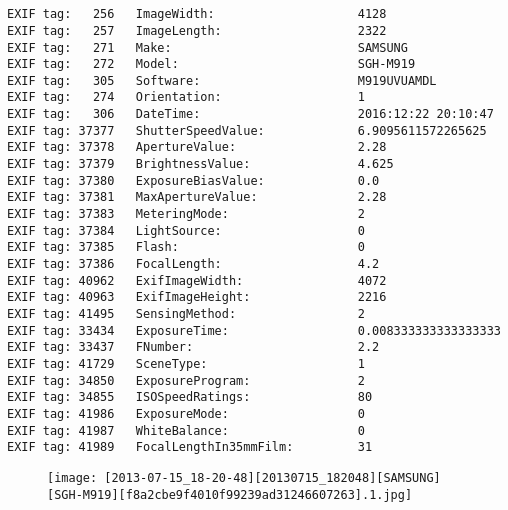 \section{\protect{}}
\noindent 
\noindent
\begin{lstlisting}
EXIF tag:   256   ImageWidth:                    4128
EXIF tag:   257   ImageLength:                   2322
EXIF tag:   271   Make:                          SAMSUNG
EXIF tag:   272   Model:                         SGH-M919
EXIF tag:   305   Software:                      M919UVUAMDL
EXIF tag:   274   Orientation:                   1
EXIF tag:   306   DateTime:                      2016:12:22 20:10:47
EXIF tag: 37377   ShutterSpeedValue:             6.9095611572265625
EXIF tag: 37378   ApertureValue:                 2.28
EXIF tag: 37379   BrightnessValue:               4.625
EXIF tag: 37380   ExposureBiasValue:             0.0
EXIF tag: 37381   MaxApertureValue:              2.28
EXIF tag: 37383   MeteringMode:                  2
EXIF tag: 37384   LightSource:                   0
EXIF tag: 37385   Flash:                         0
EXIF tag: 37386   FocalLength:                   4.2
EXIF tag: 40962   ExifImageWidth:                4072
EXIF tag: 40963   ExifImageHeight:               2216
EXIF tag: 41495   SensingMethod:                 2
EXIF tag: 33434   ExposureTime:                  0.008333333333333333
EXIF tag: 33437   FNumber:                       2.2
EXIF tag: 41729   SceneType:                     1
EXIF tag: 34850   ExposureProgram:               2
EXIF tag: 34855   ISOSpeedRatings:               80
EXIF tag: 41986   ExposureMode:                  0
EXIF tag: 41987   WhiteBalance:                  0
EXIF tag: 41989   FocalLengthIn35mmFilm:         31

\end{lstlisting}
\clearpage
\begin{figure}
\raggedleft
\texttt{[image: [2013-07-15\_18-20-48][20130715\_182048][SAMSUNG][SGH-M919][f8a2cbe9f4010f99239ad31246607263].1.jpg]}
\end{figure}


\clearpage
